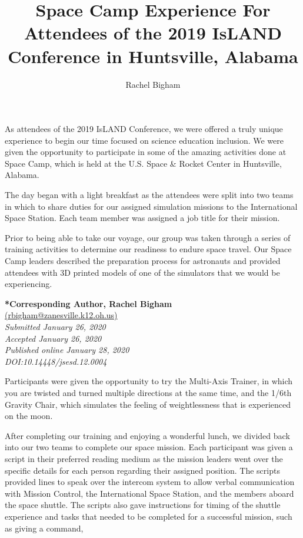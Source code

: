 \documentclass[11.5pt]{sig-alternate} %
\begin{document}
\title{Space Camp Experience For Attendees of the 2019 IsLAND Conference in Huntsville, Alabama}

\author[1]{\large \color{blue}Rachel Bigham}


\toappear{}
\maketitle
\begin{large}
As attendees of the 2019 IsLAND Conference, we were offered a truly unique experience to begin our time focused on science education inclusion. We were given the opportunity to participate in some of the amazing activities done at Space Camp, which is held at the U.S. Space \& Rocket Center in Huntsville, Alabama. 

The day began with a light breakfast as the attendees were split into two teams in which to share duties for our assigned simulation missions to the International Space Station. Each team member was assigned a job title for their mission. 

Prior to being able to take our voyage, our group was taken through a series of training activities to determine our readiness to endure space travel. Our Space Camp leaders described the preparation process for astronauts and provided attendees with 3D printed models of one of the simulators that we would be experiencing.

\textbf{*Corresponding Author, Rachel Bigham}  \\
\href{mailto: rbigham@zanesville.k12.oh.us }{(rbigham@zanesville.k12.oh.us)} \\
\textit{Submitted January 26, 2020 }\\
\textit{Accepted January 26, 2020} \\
\textit{Published online January 28, 2020} \\
\textit{DOI:10.14448/jsesd.12.0004} \\

\begin{large}
Participants were given the opportunity to try the Multi-Axis Trainer, in which you are twisted and turned multiple directions at the same time, and the 1/6th Gravity Chair, which simulates the feeling of weightlessness that is experienced on the moon. 
\end{large}

After completing our training and enjoying a wonderful lunch, we divided back into our two teams to complete our space mission. Each participant was given a script in their preferred reading medium as the mission leaders went over the specific details for each person regarding their assigned position. The scripts provided lines to speak over the intercom system to allow verbal communication with Mission Control, the International Space Station, and the members aboard the space shuttle. The scripts also gave instructions for timing of the shuttle experience and tasks that needed to be completed for a successful mission, such as giving a command,


\end{large}
\end{document}
